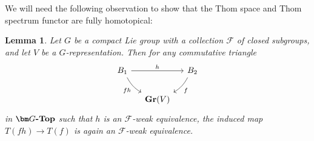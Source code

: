 \documentclass[reqno]{memo-l}
\theoremstyle{mythm}
\newtheorem{lemma}[thm]{Lemma}
\theoremstyle{definition}
\numberwithin{equation}{section}
\newcommand{\Ff}{{\mathcal{F}}}
\newcommand{\cat}[1]{\textbf{\textup{#1}}}
\begin{document}
  We will need the following observation to show that the Thom space and Thom spectrum functor are fully homotopical:

\begin{lemma}\label{app-lemma:thom-spaces-homotopical}
 Let $G$ be a compact Lie group with a collection $\Ff$ of closed subgroups, and let $V$ be a $G$-representation. Then for any commutative triangle
 \[
    \begin{tikzcd}[column sep=small]
        B_1\arrow[dr,"fh"', bend right=15pt]\arrow[rr,"h"] && B_2\arrow[dl, "f", bend left=15pt]\\
        & \cat{Gr}(V)
    \end{tikzcd}
 \]
 in $\cat{$\bm G$-Top}$ such that $h$ is an $\Ff$-weak equivalence, the induced map $T(fh)\to T(f)$ is again an $\Ff$-weak equivalence.
\end{lemma}
\end{document}
